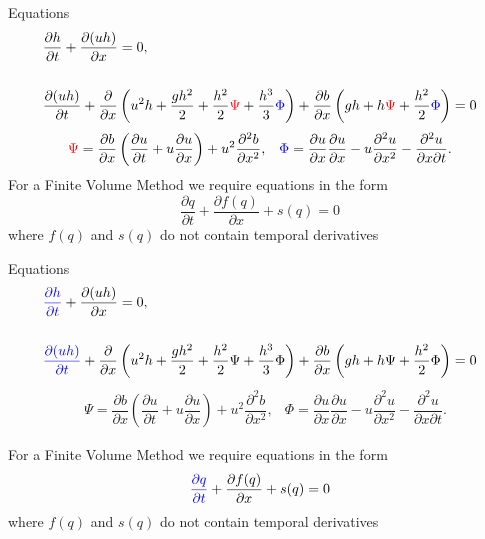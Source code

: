 \documentclass[]{beamer}
\begin{document}
\begin{frame}{Equations}
		\begin{subequations}
			\begin{align*}
			&\frac{\partial h}{\partial t} + \dfrac{\partial (uh)}{\partial x} = 0,  \\ \\
			&\dfrac{\partial (uh)}{\partial t} + \dfrac{\partial}{\partial x} \left ( u^2h + \dfrac{gh^2}{2} + \dfrac{h^2}{2}{ \color{red}\Psi } + \dfrac{h^3}{3}{ { \color{blue} \Phi } }  \right )  +  \dfrac{\partial b}{\partial x} \left (gh +   h { \color{red}\Psi } + \dfrac{h^2}{2}{ { \color{blue} \Phi } }  \right ) = 0
			\end{align*}
		\end{subequations}
				\begin{align*}
				&{ \color{red}\Psi }  = \dfrac{\partial b}{\partial x}\left(\dfrac{\partial u}{\partial t} + u\dfrac{\partial u}{\partial x} \right)  + u^2\dfrac{\partial^2 b}{\partial x^2}, &
				{ \color{blue} \Phi }  = \dfrac{\partial u }{\partial x} \dfrac{\partial u}{\partial x} -u \dfrac{\partial^2 u}{\partial x^2}  - \dfrac{\partial^2 u}{\partial x \partial t} .
				\end{align*}
	\pause
	For a Finite Volume Method we require equations in the form
	\begin{equation*}
	\frac{\partial q}{\partial t} + \frac{\partial f(q)}{\partial x} + s(q) = 0
	\end{equation*}
	where $f(q)$ and $s(q)$ do not contain temporal derivatives
\end{frame}

\begin{frame}{Equations}
	\begin{subequations}
		\begin{align*}
		& {\color{blue}\frac{\partial h}{\partial t}} + \dfrac{\partial (uh)}{\partial x} = 0,  \\ \\
		& {\color{blue}\dfrac{\partial (uh)}{\partial t}} + \dfrac{\partial}{\partial x} \left ( u^2h + \dfrac{gh^2}{2} + \dfrac{h^2}{2}{\Psi } + \dfrac{h^3}{3}{ { \Phi } }  \right )  +  \dfrac{\partial b}{\partial x} \left (gh +   h {\Psi } + \dfrac{h^2}{2}{ {  \Phi } }  \right ) = 0
		\end{align*}
	\end{subequations}
	\begin{align*}
	&{ \Psi }  = \dfrac{\partial b}{\partial x}\left(\dfrac{\partial u}{\partial t} + u\dfrac{\partial u}{\partial x} \right)  + u^2\dfrac{\partial^2 b}{\partial x^2}, &
	{  \Phi }  = \dfrac{\partial u }{\partial x} \dfrac{\partial u}{\partial x} -u \dfrac{\partial^2 u}{\partial x^2}  - \dfrac{\partial^2 u}{\partial x \partial t} .
	\end{align*}

	For a Finite Volume Method we require equations in the form
	\begin{equation*}
	{\color{blue}\frac{\partial q}{\partial t}} + \frac{\partial f(q)}{\partial x} + s(q) = 0
	\end{equation*}
	where $f(q)$ and $s(q)$ do not contain temporal derivatives
\end{frame}
\end{document}
